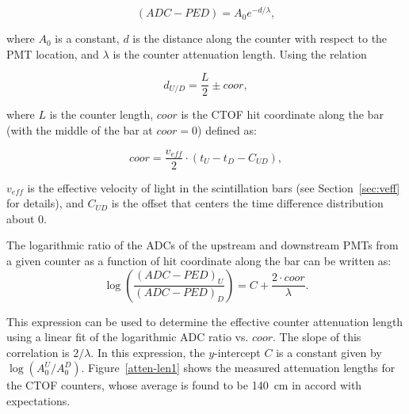 \documentclass[3p,times,twocolumn]{elsarticle}
\begin{document}
\begin{equation}
\label{al-adc}
(ADC - PED) = A_0 e^{-d/\lambda},
\end{equation}

\noindent
where $A_0$ is a constant, $d$ is the distance along the counter with respect to the PMT location, and
$\lambda$ is the counter attenuation length. Using the relation

\begin{equation}
d_{U/D} = \frac{L}{2} \pm coor,
\end{equation}

\noindent
where $L$ is the counter length, $coor$ is the CTOF hit coordinate along the bar (with the middle of the bar
at $coor=0$) defined as:

\begin{equation}
\label{coor}
coor = \frac{v_{eff}}{2} \cdot (t_U - t_D - C_{UD}),
\end{equation}

\noindent
$v_{eff}$ is the effective velocity of light in the scintillation bars (see Section~\ref{sec:veff} for details), and
$C_{UD}$ is the offset that centers the time difference distribution about 0.

The logarithmic ratio of the ADCs of the upstream and downstream PMTs from a given counter as a function of
hit coordinate along the bar can be written as:
\begin{equation}
\label{linear}
\log \left( \frac{(ADC-PED)_U}{(ADC-PED)_D} \right ) = C + \frac{2 \cdot coor}{\lambda}.
\end{equation}

\noindent
This expression can be used to determine the effective counter attenuation length using a linear fit of the
logarithmic ADC ratio vs. $coor$. The slope of this correlation is $2/\lambda$. In this expression, the
$y$-intercept $C$ is a constant given by $\log(A_0^U/A_0^D)$. Figure~\ref{atten-len1} shows the measured
attenuation lengths for the CTOF counters, whose average is found to be 140~cm in accord with expectations. 
\end{document}
